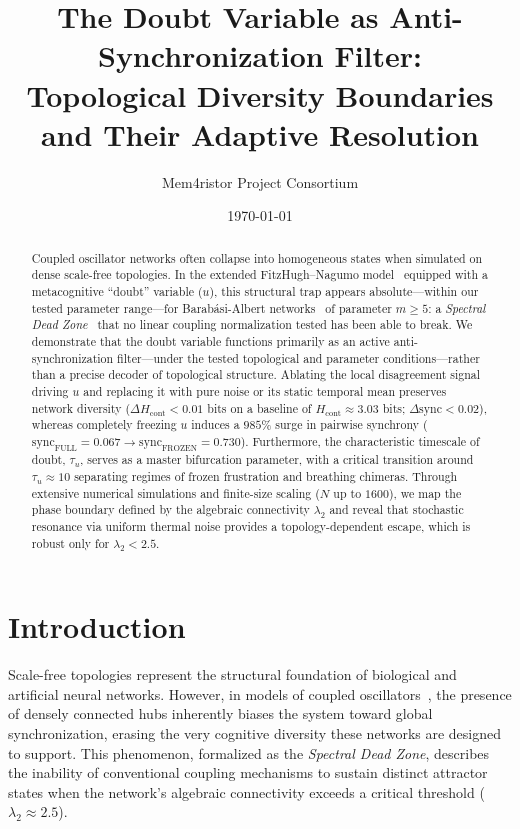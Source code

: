 \documentclass[11pt,a4paper]{article}
\title{The Doubt Variable as Anti-Synchronization Filter:\\Topological Diversity Boundaries and Their Adaptive Resolution}
\author{Mem4ristor Project Consortium}
\date{\today}
\begin{document}
\maketitle

\begin{abstract}
Coupled oscillator networks often collapse into homogeneous states when simulated on dense scale-free topologies. In the extended FitzHugh--Nagumo model~\cite{fitzhugh1961,nagumo1962} equipped with a metacognitive ``doubt'' variable ($u$), this structural trap appears absolute---within our tested parameter range---for Barab\'asi-Albert networks~\cite{barabasi1999} of parameter $m \geq 5$: a \emph{Spectral Dead Zone}~\cite{mem4ristor2026} that no linear coupling normalization tested has been able to break. We demonstrate that the doubt variable functions primarily as an active anti-synchronization filter---under the tested topological and parameter conditions---rather than a precise decoder of topological structure. Ablating the local disagreement signal driving $u$ and replacing it with pure noise or its static temporal mean preserves network diversity ($\Delta H_{\mathrm{cont}} < 0.01$ bits on a baseline of $H_{\mathrm{cont}} \approx 3.03$ bits; $\Delta\mathrm{sync} < 0.02$), whereas completely freezing $u$ induces a $985\%$ surge in pairwise synchrony ($\mathrm{sync}_{\mathrm{FULL}} = 0.067 \to \mathrm{sync}_{\mathrm{FROZEN}} = 0.730$). Furthermore, the characteristic timescale of doubt, $\tau_u$, serves as a master bifurcation parameter, with a critical transition around $\tau_u \approx 10$ separating regimes of frozen frustration and breathing chimeras. Through extensive numerical simulations and finite-size scaling ($N$ up to $1600$), we map the phase boundary defined by the algebraic connectivity $\lambda_2$ and reveal that stochastic resonance via uniform thermal noise provides a topology-dependent escape, which is robust only for $\lambda_2 < 2.5$.
\end{abstract}

\section{Introduction}
\label{sec:intro}
Scale-free topologies represent the structural foundation of biological and artificial neural networks. However, in models of coupled oscillators~\cite{pikovsky2001}, the presence of densely connected hubs inherently biases the system toward global synchronization, erasing the very cognitive diversity these networks are designed to support. This phenomenon, formalized as the \textit{Spectral Dead Zone}, describes the inability of conventional coupling mechanisms to sustain distinct attractor states when the network's algebraic connectivity exceeds a critical threshold ($\lambda_2 \approx 2.5$).
\end{document}
